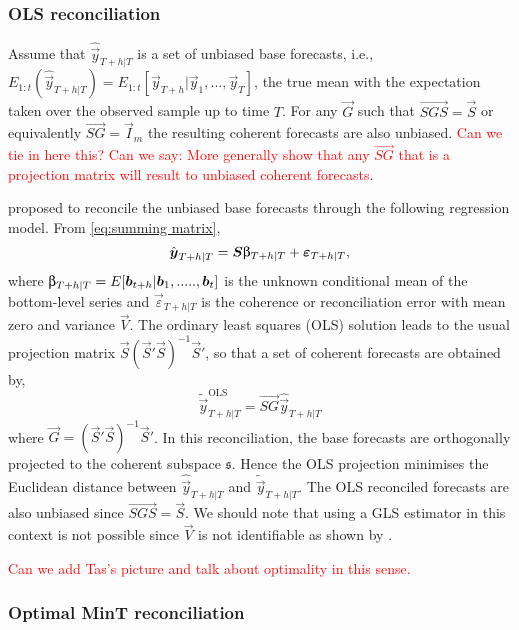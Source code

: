 \documentclass[graybox]{svmult}
\begin{document}
\subsubsection{OLS reconciliation}

Assume that $\hat{\vec{y}}_{T+h|T}$ is a set of unbiased base forecasts, i.e., $E_{1:t}(\hat{\vec{y}}_{T+h|T})= E_{1:t}[\vec{y}_{T+h}|\vec{y}_1,...,\vec{y}_T]$, the true mean with the expectation taken over the observed sample up to time $T$. For any $\vec{G}$ such that $\vec{SGS}=\vec{S}$ or equivalently $\vec{SG}=\vec{I}_m$ the resulting coherent forecasts are also unbiased. \textcolor{red}{Can we tie in here this? Can we say: More generally \citep{Gamakumara2018} show that any $\vec{SG}$ that is a projection matrix will result to unbiased coherent forecasts}.

\cite{HynEtAl2011} proposed to  reconcile the unbiased base forecasts through the following regression model.
From \eqref{eq:summing matrix},
\begin{equation}\label{eq:OLS}
\hat{\vec{y}}_{T+h|T} = \vec{S\ubeta}_{T+h|T} + \vec{\varepsilon}_{T+h|T},
\end{equation}
where $\vec{\ubeta}_{T+h|T}=E[\vec{b}_{t+h}|\vec{b}_1,.....,\vec{b}_t]$ is the unknown conditional mean of the bottom-level series and $\vec{\varepsilon}_{T+h|T}$ is the coherence or reconciliation error with mean zero and variance $\vec{V}$. The ordinary least squares (OLS) solution leads to the usual projection matrix $\vec{S}(\vec{S}'\vec{S})^{-1}\vec{S}'$, so that a set of coherent forecasts are obtained by,
\begin{equation*}
\tilde{\vec{y}}_{T+h|T}^{\text{OLS}} = \vec{SG}\hat{\vec{y}}_{T+h|T}
\end{equation*}
where $\vec{G}=(\vec{S}'\vec{S})^{-1}\vec{S}'$. 
In this reconciliation, the base forecasts are orthogonally projected to the coherent subspace $\mathfrak{s}$. Hence the OLS projection minimises the Euclidean distance between $\hat{\vec{y}}_{T+h|T}$ and $\tilde{\vec{y}}_{T+h|T}$. The OLS reconciled forecasts are also unbiased since $\vec{SGS}=\vec{S}$. We should note that using a GLS estimator in this context is not possible since $\vec{V}$ is not identifiable as shown by \cite{WicEtAl2019}.

\textcolor{red}{Can we add Tas's picture and talk about optimality in this sense.}
\subsubsection{Optimal MinT reconciliation}
\end{document}
